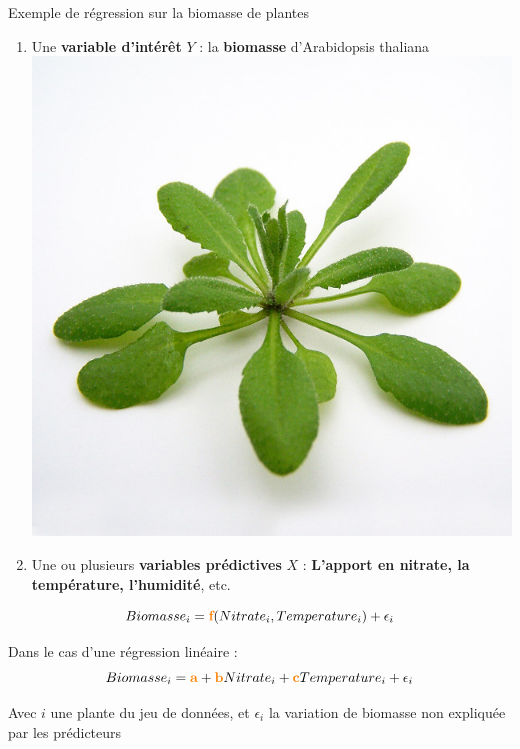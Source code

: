 	
	\begin{frame}{Exemple de régression sur la biomasse de plantes}

		\begin{enumerate}
		    \item Une \textbf{variable d'intérêt} $Y$ : la \textbf{biomasse} d'Arabidopsis thaliana \includegraphics[scale = 0.041]{Figures/Intro/Arabidopsis.jpg}
		
		    
		    \item Une ou plusieurs \textbf{variables prédictives} $X$ :  \textbf{L'apport en nitrate, la température, l'humidité}, etc.
		\end{enumerate}

		\begin{equation*}
		    Biomasse_i = \textcolor{orange}{\textbf{f}}(Nitrate_i, Temperature_i) + \epsilon_i
		\end{equation*}
		
		Dans le cas d'une régression linéaire :
		\begin{equation*}
    	    Biomasse_i = \textcolor{orange}{\textbf{a}} + \textcolor{orange}{\textbf{b}}Nitrate_i +\textcolor{orange}{\textbf{c}}Temperature_i + \epsilon_i
    	\end{equation*}
		
		\small
		Avec $i$ une plante du jeu de données, et $\epsilon_i$ la variation de biomasse non expliquée par les prédicteurs

	\end{frame}
	
